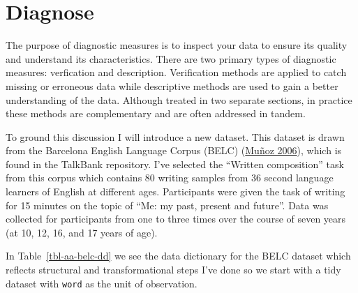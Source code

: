 \documentclass[
  letterpaper,
  DIV=11,
  numbers=noendperiod]{scrreport}
\theoremstyle{definition}
\theoremstyle{remark}
\begin{document}
\hypertarget{sec-aa-diagnose}{%
\section{Diagnose}\label{sec-aa-diagnose}}

The purpose of diagnostic measures is to inspect your data to ensure its
quality and understand its characteristics. There are two primary types
of diagnostic measures: verfication and description. Verification
methods are applied to catch missing or erroneous data while descriptive
methods are used to gain a better understanding of the data. Although
treated in two separate sections, in practice these methods are
complementary and are often addressed in tandem.

To ground this discussion I will introduce a new dataset. This dataset
is drawn from the Barcelona English Language Corpus (BELC)
(\protect\hyperlink{ref-Munoz2006}{Muñoz 2006}), which is found in the
TalkBank repository. I've selected the ``Written composition'' task from
this corpus which contains 80 writing samples from 36 second language
learners of English at different ages. Participants were given the task
of writing for 15 minutes on the topic of ``Me: my past, present and
future''. Data was collected for participants from one to three times
over the course of seven years (at 10, 12, 16, and 17 years of age).

In Table~\ref{tbl-aa-belc-dd} we see the data dictionary for the BELC
dataset which reflects structural and transformational steps I've done
so we start with a tidy dataset with \texttt{word} as the unit of
observation.
\end{document}
